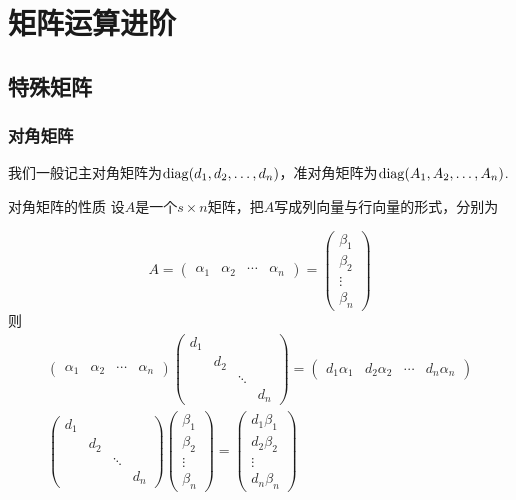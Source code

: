 \chapter{矩阵运算进阶} \label{chap:矩阵运算进阶}

\section{特殊矩阵}

\subsection{对角矩阵}

我们一般记主对角矩阵为$\operatorname{diag}(d_1,d_2,\ldots,d_n)$，准对角矩阵为$\operatorname{diag}(A_1,A_2,\ldots,A_n)$.
\begin{theorem}{}{对角矩阵的性质}
    设$A$是一个$s \times n$矩阵，把$A$写成列向量与行向量的形式，分别为

    \[ A = \begin{pmatrix}\alpha_1 & \alpha_2 & \cdots & \alpha_n\end{pmatrix} = \begin{pmatrix} \beta_1 \\ \beta_2 \\ \vdots \\ \beta_n \end{pmatrix} \]
    则
    \begin{gather*}
        \begin{pmatrix}\alpha_1 & \alpha_2 & \cdots & \alpha_n\end{pmatrix}
        \begin{pmatrix}
            d_1 &     &        &     \\
                & d_2 &        &     \\
                &     & \ddots &     \\
                &     &        & d_n
        \end{pmatrix} = \begin{pmatrix}d_1\alpha_1 & d_2\alpha_2 & \cdots & d_n\alpha_n\end{pmatrix} \\
        \begin{pmatrix}
            d_1 &     &        &     \\
                & d_2 &        &     \\
                &     & \ddots &     \\
                &     &        & d_n
        \end{pmatrix} \begin{pmatrix} \beta_1 \\ \beta_2 \\ \vdots \\ \beta_n \end{pmatrix} = \begin{pmatrix} d_1\beta_1 \\ d_2\beta_2 \\ \vdots \\ d_n\beta_n \end{pmatrix}
    \end{gather*}


\end{theorem}
